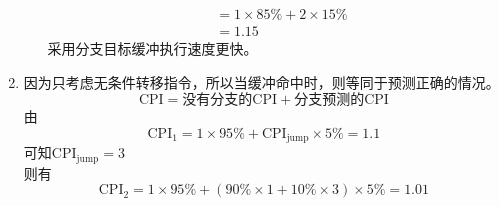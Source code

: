 \documentclass{article}
\begin{document}
\begin{enumerate}[label=\arabic*.]
\begin{enumerate}[label=(\arabic*)]
\begin{align*}
                &= 1 \times 85\% + 2 \times 15\% \\
                &= 1.15
            \end{align*}
            采用分支目标缓冲执行速度更快。
        \end{enumerate}
        \item 因为只考虑无条件转移指令，所以当缓冲命中时，则等同于预测正确的情况。\\
        $$\text{CPI} = \text{没有分支的CPI}+\text{分支预测的CPI}$$
        由
        $$\text{CPI}_1 = 1 \times 95\% + \text{CPI}_\text{jump} \times 5\% = 1.1$$
        可知$\text{CPI}_\text{jump} = 3$\\
        则有
        $$\text{CPI}_2 = 1 \times 95\% + (90\% \times 1 + 10\% \times 3) \times 5\% = 1.01$$
    \end{enumerate}
\end{document}
